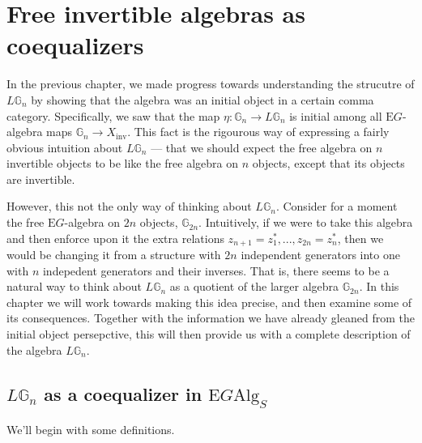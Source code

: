 \chapter{Free invertible algebras as coequalizers}
\label{coeqalgebra}

In the previous chapter, we made progress towards understanding the strucutre of $L\mathbb{G}_n$ by showing that the algebra was an initial object in a certain comma category. Specifically, we saw that the map $\eta: \mathbb{G}_n \to L\mathbb{G}_n$ is initial among all $\mathrm{E}G$-algebra maps $\mathbb{G}_n \to X_{\mathrm{inv}}$. This fact is the rigourous way of expressing a fairly obvious intuition about $L\mathbb{G}_n$ --- that we should expect the free algebra on $n$ invertible objects to be like the free algebra on $n$ objects, except that its objects are invertible.

However, this not the only way of thinking about $L\mathbb{G}_n$. Consider for a moment the free $\mathrm{E}G$-algebra on $2n$ objects, $\mathbb{G}_{2n}$. Intuitively, if we were to take this algebra and then enforce upon it the extra relations $z_{n+1} = z_1^*, ..., z_{2n} = z_n^*$, then we would be changing it from a structure with $2n$ independent generators into one with $n$ indepedent generators and their inverses. That is, there seems to be a natural way to think about $L\mathbb{G}_n$ as a quotient of the larger algebra $\mathbb{G}_{2n}$. In this chapter we will work towards making this idea precise, and then examine some of its consequences. Together with the information we have already gleaned from the initial object persepctive, this will then provide us with a complete description of the algebra $L\mathbb{G}_n$.

\section{$L\mathbb{G}_n$ as a coequalizer in $\mathrm{E}G\mathrm{Alg}_S$} 

We'll begin with some definitions.

